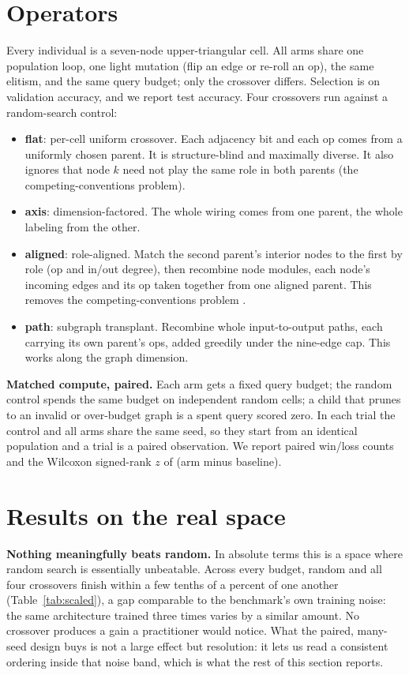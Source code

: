 \documentclass[11pt]{article}
\begin{document}
\section{Operators}

Every individual is a seven-node upper-triangular cell. All arms share one population loop, one
light mutation (flip an edge or re-roll an op), the same elitism, and the same query budget;
only the crossover differs. Selection is on validation accuracy, and we report test accuracy.
Four crossovers run against a random-search control:

\begin{itemize}
\item \textbf{flat}: per-cell uniform crossover. Each adjacency bit and each op comes from a
uniformly chosen parent. It is structure-blind and maximally diverse. It also ignores that node
$k$ need not play the same role in both parents (the competing-conventions problem).
\item \textbf{axis}: dimension-factored. The whole wiring comes from one parent, the whole
labeling from the other.
\item \textbf{aligned}: role-aligned. Match the second parent's interior nodes to the first by
role (op and in/out degree), then recombine node modules, each node's incoming edges and its op
taken together from one aligned parent. This removes the competing-conventions problem
\cite{neat2002,modxover2021}.
\item \textbf{path}: subgraph transplant. Recombine whole input-to-output paths, each carrying
its own parent's ops, added greedily under the nine-edge cap. This works along the graph
dimension.
\end{itemize}

\textbf{Matched compute, paired.} Each arm gets a fixed query budget; the random control spends
the same budget on independent random cells; a child that prunes to an invalid or over-budget
graph is a spent query scored zero. In each trial the control and all arms share the same seed,
so they start from an identical population and a trial is a paired observation. We report paired
win/loss counts and the Wilcoxon signed-rank $z$ of (arm minus baseline).

\section{Results on the real space}

\textbf{Nothing meaningfully beats random.} In absolute terms this is a space where random
search is essentially unbeatable. Across every budget, random and all four crossovers finish
within a few tenths of a percent of one another (Table~\ref{tab:scaled}), a gap comparable to
the benchmark's own training noise: the same architecture trained three times varies by a
similar amount. No crossover produces a gain a practitioner would notice. What the paired,
many-seed design buys is not a large effect but resolution: it lets us read a consistent
ordering inside that noise band, which is what the rest of this section reports.
\end{document}
